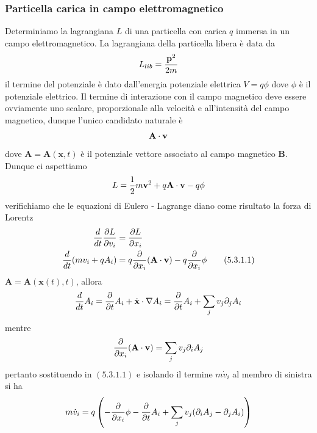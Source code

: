 \documentclass{article}
\begin{document}
\subsubsection{Particella carica in campo elettromagnetico}
Determiniamo la lagrangiana $L$ di una particella con carica $q$ immersa in un campo elettromagnetico. La lagrangiana della particella libera è data da
\begin{gather}
    L_{lib} = \frac{\mathbf{p}^2}{2m} \notag
\end{gather}
il termine del potenziale è dato dall'energia potenziale elettrica $V = q\phi$ dove $\phi$ è il potenziale elettrico. Il termine di interazione con il campo magnetico deve essere ovviamente uno scalare, proporzionale alla velocità e all'intensità del campo magnetico, dunque l'unico candidato naturale è
\begin{gather}
    \mathbf{A} \cdot \mathbf{v} \notag
\end{gather}
dove $\mathbf{A} = \mathbf{A}(\mathbf{x}, t)$ è il potenziale vettore associato al campo magnetico $\mathbf{B}$. Dunque ci aspettiamo
\begin{gather}
    L = \frac{1}{2}m\mathbf{v}^2 + q\mathbf{A} \cdot \mathbf{v} - q\phi \notag
\end{gather}
verifichiamo che le equazioni di Eulero - Lagrange diano come risultato la forza di Lorentz
\begin{align}
    \frac{d}{dt}\frac{\partial L}{\partial v_i} &= \frac{\partial L}{\partial x_i} \notag \\
    \frac{d}{dt}(mv_i + qA_i) &= q\frac{\partial}{\partial x_i}(\mathbf{A} \cdot \mathbf{v}) - q\frac{\partial}{\partial x_i}\phi \tag{5.3.1.1} 
\end{align}
$\mathbf{A} = \mathbf{A}(\mathbf{x}(t), t)$, allora
\begin{gather}
    \frac{d}{dt}A_i = \frac{\partial}{\partial t}A_i + \dot{\mathbf{x}} \cdot \nabla A_i = \frac{\partial}{\partial t}A_i + \sum_jv_j\partial_jA_i \notag
\end{gather}
mentre
\begin{gather}
    \frac{\partial}{\partial x_i}(\mathbf{A} \cdot \mathbf{v}) = \sum_j v_j\partial_iA_j \notag
\end{gather}
pertanto sostituendo in $(5.3.1.1)$ e isolando il termine $m\dot{v}_i$ al membro di sinistra si ha
\begin{align}
    m\dot{v}_i = q\left( - \frac{\partial}{\partial x_i}\phi - \frac{\partial}{\partial t}A_i + \sum_j v_j(\partial_iA_j - \partial_jA_i) \right) \notag
\end{align}
\end{document}
